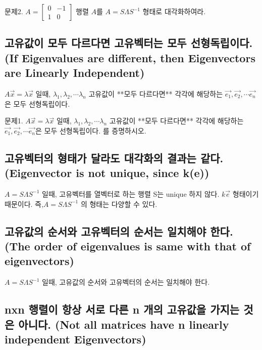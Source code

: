 문제2. $A=\begin{bmatrix}0 & -1 \\ 1 & 0\end{bmatrix}$ 행렬 $A$를 $A = S\Lambda S^{-1}$ 형태로 대각화하여라.


\newpage
\subsection{고유값이 모두 다르다면 고유벡터는 모두 선형독립이다. (If Eigenvalues are different, then Eigenvectors are Linearly Independent)}

\begin{theorem}

$A\vec{x}=\lambda\vec{x}$ 일때, $\lambda_1,  \lambda_2, \cdots  \lambda_n$ 고유값이 **모두 다르다면** 각각에 해당하는 $\vec{e_1}, \vec{e_2}, \cdots \vec{e_n}$은 모두 선형독립이다.

\end{theorem}
\newpage
문제1. $A\vec{x}=\lambda\vec{x}$ 일때, $\lambda_1,  \lambda_2, \cdots  \lambda_n$ 고유값이 **모두 다르다면** 각각에 해당하는 $\vec{e_1}, \vec{e_2}, \cdots \vec{e_n}$은 모두 선형독립이다. 를 증명하시오. 
\newpage
\subsection{고유벡터의 형태가 달라도 대각화의 결과는 같다. (Eigenvector is not unique, since k(e))}

\begin{theorem}

$A = S\Lambda S^{-1}$ 일때, 고유벡터를 열벡터로 하는 행렬 S는 unique 하지 않다. $k\vec{e}$ 형태이기 때문이다. 즉,$A = S\Lambda S^{-1}$ 의 형태는 다양할 수 있다.

\end{theorem}


\newpage
\subsection{고유값의 순서와 고유벡터의 순서는 일치해야 한다. (The order of eigenvalues is same with that of eigenvectors)}

\begin{theorem}

$A = S\Lambda S^{-1}$ 일때, 고유값의 순서와 고유벡터의 순서는 일치해야 한다.

\end{theorem}


\newpage
\subsection{nxn 행렬이 항상 서로 다른 n 개의 고유값을 가지는 것은 아니다. (Not all matrices have n linearly independent Eigenvectors)}

